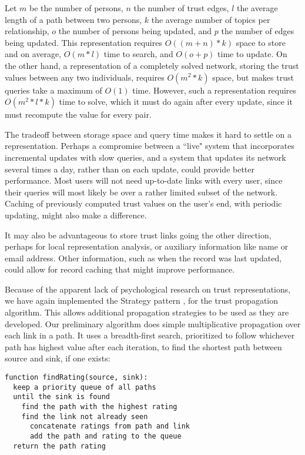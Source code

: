 \documentclass[letterpaper]{www2006-submission}
\begin{document}
Let $m$ be the number of persons, $n$ the number of trust edges, $l$ the average length of a path between two persons, $k$ the average number of topics per relationship, $o$ the number of persons being updated, and $p$ the number of edges being updated.  This representation requires $O((m+n)*k)$ space to store and on average, $O(m*l)$ time to search, and $O(o+p)$ time to update.  On the other hand, a representation of a completely solved network, storing the trust values between any two individuals, requires $O(m^2*k)$ space, but makes trust queries take a maximum of $O(1)$ time.  However, such a representation requires $O(m^2*l*k)$ time to solve, which it must do again after every update, since it must recompute the value for every pair.  

The tradeoff between storage space and query time makes it hard to settle on a representation.  Perhaps a compromise between a ``live" system that incorporates incremental updates with slow queries, and a system that updates its network several times a day, rather than on each update, could provide better performance.  Most users will not need up-to-date links with every user, since their queries will most likely be over a rather limited subset of the network.  Caching of previously computed trust values on the user's end, with periodic updating, might also make a difference.

It may also be advantageous to store trust links going the other direction, perhaps for local representation analysis, or auxiliary information like name or email address.  Other information, such as when the record was last updated, could allow for record caching that might improve performance.

Because of the apparent lack of psychological research on trust representations, we have again implemented the Strategy pattern \citep{designPatterns}, for the trust propagation algorithm.  This allows additional propagation strategies to be used as they are developed.  Our preliminary algorithm does simple multiplicative propagation over each link in a path.  It uses a breadth-first search, prioritized to follow whichever path has highest value after each iteration, to find the shortest path between source and sink, if one exists:

\begin{verbatim}
function findRating(source, sink):
  keep a priority queue of all paths
  until the sink is found
    find the path with the highest rating
    find the link not already seen
      concatenate ratings from path and link
      add the path and rating to the queue
  return the path rating
\end{verbatim}
\end{document}
